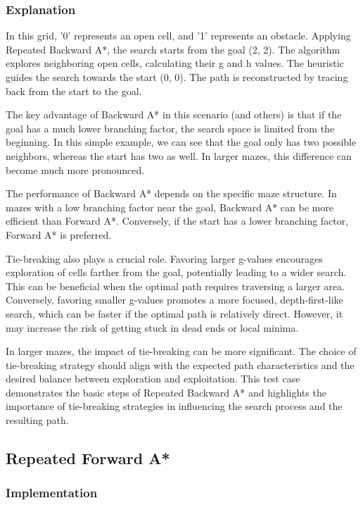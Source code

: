 \documentclass[12pt]{article}
\begin{document}
\subsubsection{Explanation}

In this grid, '0' represents an open cell, and '1' represents an obstacle. Applying Repeated Backward A*, the search starts from the goal (2, 2). The algorithm explores neighboring open cells, calculating their g and h values. The heuristic guides the search towards the start (0, 0). The path is reconstructed by tracing back from the start to the goal.

The key advantage of Backward A* in this scenario (and others) is that if the goal has a much lower branching factor, the search space is limited from the beginning. In this simple example, we can see that the goal only has two possible neighbors, whereas the start has two as well. In larger mazes, this difference can become much more pronounced.

The performance of Backward A* depends on the specific maze structure. In mazes with a low branching factor near the goal, Backward A* can be more efficient than Forward A*. Conversely, if the start has a lower branching factor, Forward A* is preferred.

Tie-breaking also plays a crucial role. Favoring larger g-values encourages exploration of cells farther from the goal, potentially leading to a wider search. This can be beneficial when the optimal path requires traversing a larger area. Conversely, favoring smaller g-values promotes a more focused, depth-first-like search, which can be faster if the optimal path is relatively direct. However, it may increase the risk of getting stuck in dead ends or local minima.

In larger mazes, the impact of tie-breaking can be more significant. The choice of tie-breaking strategy should align with the expected path characteristics and the desired balance between exploration and exploitation. This test case demonstrates the basic steps of Repeated Backward A* and highlights the importance of tie-breaking strategies in influencing the search process and the resulting path.


\subsection{ Repeated Forward A* }

\subsubsection{Implementation}
\end{document}
